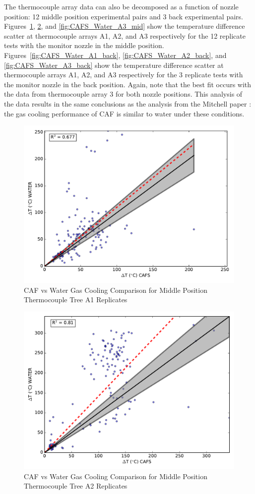 \documentclass[12pt,oneside]{book}
\begin{document}
\clearpage

The thermocouple array data can also be decomposed as a function of nozzle position: 12 middle position experimental pairs and 3 back experimental pairs. Figures~\ref{fig:CAFS_Water_A1_mid}, \ref{fig:CAFS_Water_A2_mid}, and \ref{fig:CAFS_Water_A3_mid} show the temperature difference scatter at thermocouple arrays A1, A2, and A3 respectively for the 12 replicate tests with the monitor nozzle in the middle position. Figures~\ref{fig:CAFS_Water_A1_back}, \ref{fig:CAFS_Water_A2_back}, and \ref{fig:CAFS_Water_A3_back} show the temperature difference scatter at thermocouple arrays A1, A2, and A3 respectively for the 3 replicate tests with the monitor nozzle in the back position. Again, note that the best fit occurs with the data from thermocouple array 3 for both nozzle positions. This analysis of the data results in the same conclusions as the analysis from the Mitchell paper \cite{Mitchell:1}: the gas cooling performance of CAF is similar to water under these conditions. 

\begin{figure}[!ht]
	\includegraphics[width=.7\columnwidth]{../Figures/Gas_Cooling/Combined_mid_A1_scatter}
	\caption{CAF vs Water Gas Cooling Comparison for Middle Position Thermocouple Tree A1 Replicates}
	\label{fig:CAFS_Water_A1_mid}
\end{figure}

\begin{figure}[!ht]
	\includegraphics[width=.7\columnwidth]{../Figures/Gas_Cooling/Combined_mid_A2_scatter}
	\caption{CAF vs Water Gas Cooling Comparison for Middle Position Thermocouple Tree A2 Replicates}
	\label{fig:CAFS_Water_A2_mid}
\end{figure}
\end{document}
